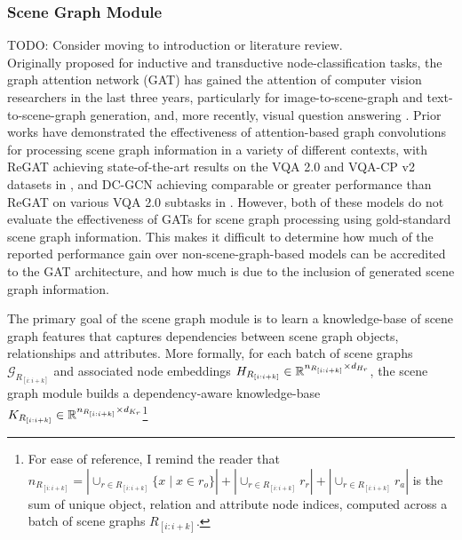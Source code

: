\subsubsection{Scene Graph Module}
{\color{red} TODO: Consider moving to introduction or literature review.\\
\color{blue}
Originally proposed for inductive and transductive node-classification tasks, the graph attention network (GAT) \cite{velivckovic2017graph} has gained the attention of computer vision researchers in the last three years, particularly for image-to-scene-graph \cite{yang2018graph} and text-to-scene-graph \cite{han2020victr} generation, and, more recently, visual question answering \cite{li2019relation, huang2020aligned}.
Prior works have demonstrated the effectiveness of attention-based graph convolutions for processing scene graph information in a variety of different contexts, with ReGAT \cite{li2019relation} achieving state-of-the-art results on the VQA 2.0 and VQA-CP v2 datasets in \citeyear{li2019relation}, and DC-GCN \cite{huang2020aligned} achieving comparable or greater performance than ReGAT on various VQA 2.0 subtasks in \citeyear{huang2020aligned}. However, both of these models do not evaluate the effectiveness of GATs for scene graph processing using gold-standard scene graph information. This makes it difficult to determine how much of the reported performance gain over non-scene-graph-based models can be accredited to the GAT architecture, and how much is due to the inclusion of generated scene graph information.}

The primary goal of the scene graph module is to learn a knowledge-base of scene graph features that captures dependencies between scene graph objects, relationships and attributes. More formally, for each batch of scene graphs \(\mathcal{G}_{R_{[i:i+k]}}\) and associated node embeddings \(H_{R_{[i:i+k]}} \in \mathbb{R}^{n_{R_{[i:i+k]}} \times d_{H_r}}\), the scene graph module builds a dependency-aware knowledge-base \(K_{R_{[i:i+k]}} \in \mathbb{R}^{n_{R_{[i:i+k]}} \times d_{K_r}}\)\footnote{For ease of reference, I remind the reader that \(n_{R_{[i:i+k]}} = |\cup_{r \in R_{[i:i+k]}}\{x \mid x \in r_o\}| + |\cup_{r \in R_{[i:i+k]}}r_r| + |\cup_{r \in R_{[i:i+k]}}r_a|\) is the sum of unique object, relation and attribute node indices, computed across a batch of scene graphs \(R_{[i:i+k]}\).}


